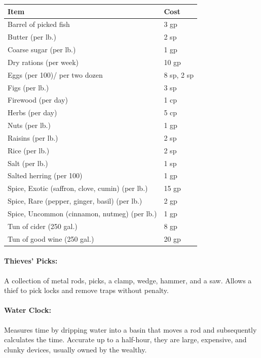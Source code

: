 \begin{multicols}{2}
\begin{minipage}{\columnwidth}
\label{provisions}
\noindent
\begin{tabular}{|p{}|p{}|}
\hline
Item					& Cost \\
\hline\hline
\rowcolor[gray]{.9}Barrel of picked fish	& 3 gp \\
Butter (per lb.)		& 2 sp \\
\rowcolor[gray]{.9}Coarse sugar (per lb.)	& 1 gp \\
Dry rations (per week)	& 10 gp \\
\rowcolor[gray]{.9}Eggs (per 100)/ per two dozen	& 8 sp, 2 sp \\
Figs (per lb.)			& 3 sp \\
\rowcolor[gray]{.9}Firewood (per day)		& 1 cp \\
Herbs (per day)			& 5 cp \\
\rowcolor[gray]{.9}Nuts (per lb.)			& 1 gp \\
Raisins (per lb.)		& 2 sp \\
\rowcolor[gray]{.9}Rice (per lb.)			& 2 sp \\
Salt (per lb.)			& 1 sp \\
\rowcolor[gray]{.9}Salted herring (per 100)	& 1 gp \\
Spice, Exotic (saffron, clove, cumin) (per lb.)	& 15 gp \\
\rowcolor[gray]{.9}Spice, Rare (pepper, ginger, basil) (per lb.)	& 2 gp \\
Spice, Uncommon (cinnamon, nutmeg) (per lb.)	& 1 gp \\
\rowcolor[gray]{.9}Tun of cider (250 gal.)	& 8 gp \\
Tun of good wine (250 gal.)	& 20 gp \\
\hline
\end{tabular}

\end{minipage}

\paragraph{Thieves' Picks:} A collection of metal rods, picks, a clamp, wedge, hammer, and a saw.  Allows a thief to pick locks and remove traps without penalty.  

\paragraph{Water Clock:} Measures time by dripping water into a basin that moves a rod and subsequently calculates the time.  Accurate up to a half-hour, they are large, expensive, and clunky devices, usually owned by the wealthy.


\end{multicols}
